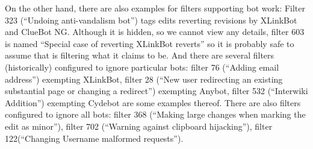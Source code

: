 On the other hand, there are also examples for filters supporting bot work:
Filter 323 (``Undoing anti-vandalism bot'') tags edits reverting revisions by XLinkBot and ClueBot NG.
Although it is hidden, so we cannot view any details, filter 603 is named ``Special case of reverting XLinkBot reverts'' so it is probably safe to assume that is filtering what it claims to be.
And there are several filters (historically) configured to ignore particular bots: filter 76 (``Adding email address'') exempting XLinkBot, filter 28 (``New user redirecting an existing substantial page or changing a redirect'') exempting Anybot, filter 532 (``Interwiki Addition'') exempting Cydebot are some examples thereof.
There are also filters configured to ignore all bots: filter 368 (``Making large changes when marking the edit as minor''), filter 702 (``Warning against clipboard hijacking''), filter 122(``Changing Username malformed requests'').

